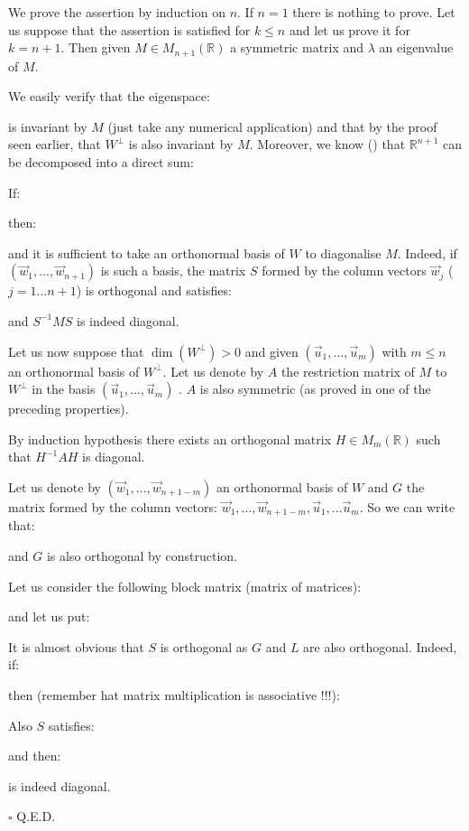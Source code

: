 	\begin{dem}
	We prove the assertion by induction on $n$. If $n=1$ there is nothing to prove. Let us suppose that the assertion is satisfied for $k\leq n$ and let us prove it for $k=n+1$. Then given $M\in M_{n+1}(\mathbb{R})$ a symmetric matrix and $\lambda$ an eigenvalue of $M$.
	
	We easily verify that the eigenspace:
	
	is invariant by $M$ (just take any numerical application) and that by the proof seen earlier, that $W^\perp$ is also invariant by $M$. Moreover, we know () that $\mathbb{R}^{n+1}$ can be decomposed into a direct sum:
	
	If:
	
	then:
	
	and it is sufficient to take an orthonormal basis of $W$ to diagonalise $M$. Indeed, if $(\vec{w}_1,\ldots,\vec{w}_{n+1})$ is such a basis, the matrix $S$ formed by the column vectors $\vec{w}_j$ ($j=1\ldots n+1$) is orthogonal and satisfies:
	
	and $S^{-1}MS$ is indeed diagonal.
	
	Let us now suppose that $\dim(W^\perp)>0$ and given $(\vec{u}_1,\ldots,\vec{u}_m)$ with $m\leq n$ an orthonormal basis of $W^\perp$. Let us denote by $A$ the restriction matrix of $M$ to $W^\perp$ in the basis  $(\vec{u}_1,\ldots,\vec{u}_m)$ . $A$ is also  symmetric (as proved in one of the preceding properties).
	
	By induction hypothesis there exists an orthogonal matrix $H\in M_m(\mathbb{R})$ such that $H^{-1}AH$ is diagonal.
	
	Let us denote by $(\vec{w}_1,\ldots,\vec{w}_{n+1-m})$ an orthonormal basis of $W$ and $G$ the matrix formed by the column vectors: $\vec{w}_1,\ldots,\vec{w}_{n+1-m},\vec{u}_1,\ldots\vec{u}_m$. So we can write that:
	
	and $G$ is also orthogonal by construction.
	
	Let us consider the following block matrix (matrix of matrices):
	
	and let us put:
	
	It is almost obvious that $S$ is orthogonal as $G$ and $L$ are also orthogonal. Indeed, if:
	
	then (remember hat matrix multiplication is associative !!!):
	
	Also $S$ satisfies:
	
	and then:
	
	is indeed diagonal.
	\begin{flushright}
		$\square$  Q.E.D.
	\end{flushright}
	\end{dem}
